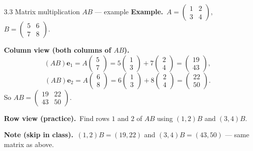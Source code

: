 \documentclass[11pt,aspectratio=169]{beamer}
\begin{document}
\begin{frame}{3.3 Matrix multiplication $AB$ --- example}
  \footnotesize
  \textbf{Example.}\
  $A=\begin{pmatrix}1&2\\ 3&4\end{pmatrix}$,
  $B=\begin{pmatrix}5&6\\ 7&8\end{pmatrix}$.

  \medskip
  \textbf{Column view (both columns of $AB$).}\
  \[
    (AB)\mathbf{e}_1
    = A\begin{pmatrix}5\\ 7\end{pmatrix}
    = 5\begin{pmatrix}1\\ 3\end{pmatrix}+7\begin{pmatrix}2\\ 4\end{pmatrix}
    = \begin{pmatrix}19\\ 43\end{pmatrix},
  \]
  \[
    (AB)\mathbf{e}_2
    = A\begin{pmatrix}6\\ 8\end{pmatrix}
    = 6\begin{pmatrix}1\\ 3\end{pmatrix}+8\begin{pmatrix}2\\ 4\end{pmatrix}
    = \begin{pmatrix}22\\ 50\end{pmatrix}.
  \]
  So $AB=\begin{pmatrix}19&22\\ 43&50\end{pmatrix}$.

  \medskip
  \textbf{Row view (practice).}\
  Find rows $1$ and $2$ of $AB$ using
  $(1,2)B$ and $(3,4)B$.

  \medskip
  {\scriptsize \textbf{Note (skip in class).}\
  $(1,2)B=(19,22)$ and $(3,4)B=(43,50)$ --- same matrix as above.}
\end{frame}
\end{document}
